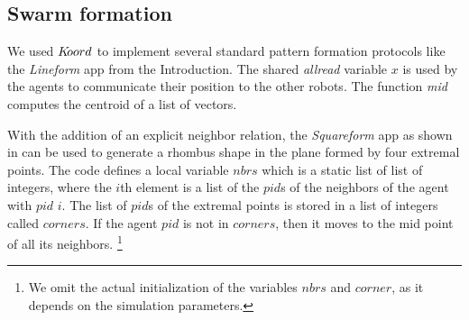 \subsection{Swarm formation}
\label{sec:formation}
We used $K\kern-2pt oord$ to implement several standard pattern formation protocols like the  \emph{Lineform} app from the Introduction.  
%
%                  
%        
%
The shared \emph{allread} variable $x$ is used by the agents to communicate their position to the other robots. The function \emph{mid} computes the centroid of a list of vectors.


With the addition of an explicit neighbor relation, the \emph{Squareform} app as shown in  can be used to generate a rhombus shape in the plane formed by four extremal points. The code defines a local variable $nbrs$ which is a static list of list of integers, where the $i$th element is a list of the $\mathit{pid}$s of the neighbors of the agent with $\mathit{pid}$ $i$. The list of $\mathit{pid}$s of the extremal points is stored in a list of integers called $\mathit{corners}$. If the agent $\mathit{pid}$ is not in $\mathit{corners}$, then it moves to the mid point of all its neighbors. \footnote{We omit the actual initialization of the variables $\mathit{nbrs}$ and $\mathit{corner}$, as it depends on the simulation parameters.}

